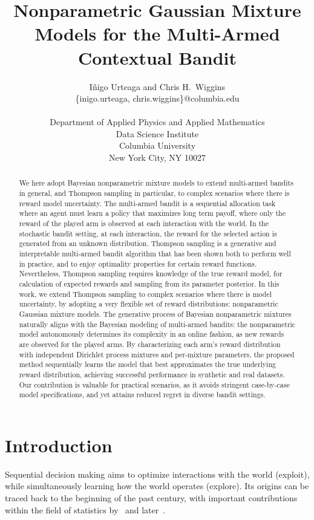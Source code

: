 \documentclass{article}
\title{Nonparametric Gaussian Mixture Models for the Multi-Armed Contextual Bandit}
\author{ I\~{n}igo Urteaga and Chris H.~Wiggins\\
	{\sf \{inigo.urteaga, chris.wiggins\}@columbia.edu} \\\\
	Department of	Applied Physics and Applied Mathematics\\
	Data Science Institute\\
	Columbia University\\
	New York City, NY 10027
}
\begin{document}
\maketitle

\begin{abstract}
We here adopt Bayesian nonparametric mixture models to extend multi-armed bandits in general, and Thompson sampling in particular, to complex scenarios where there is reward model uncertainty.
The multi-armed bandit is a sequential allocation task where an agent must learn a policy that maximizes long term payoff, where only the reward of the played arm is observed at each interaction with the world. In the stochastic bandit setting, at each interaction, the reward for the selected action is generated from an unknown distribution. Thompson sampling is a generative and interpretable multi-armed bandit algorithm that has been shown both to perform well in practice, and to enjoy optimality properties for certain reward functions. Nevertheless, Thompson sampling requires knowledge of the true reward model, for calculation of expected rewards and sampling from its parameter posterior. In this work, we extend Thompson sampling to complex scenarios where there is model uncertainty, by adopting a very flexible set of reward distributions: nonparametric Gaussian mixture models. The generative process of Bayesian nonparametric mixtures naturally aligns with the Bayesian modeling of multi-armed bandits: the nonparametric model autonomously determines its complexity in an online fashion, as new rewards are observed for the played arms. By characterizing each arm's reward distribution with independent Dirichlet process mixtures and per-mixture parameters, the proposed method sequentially learns the model that best approximates the true underlying reward distribution, achieving successful performance in synthetic and real datasets. Our contribution is valuable for practical scenarios, as it avoids stringent case-by-case model specifications, and yet attains reduced regret in diverse bandit settings.
\end{abstract}

\section{Introduction}
\label{sec:introduction}

Sequential decision making aims to optimize interactions with the world (exploit), while simultaneously learning how the world operates (explore). Its origins can be traced back to the beginning of the past century, with important contributions within the field of statistics by~\citet{j-Thompson1935} and later~\citet{j-Robbins1952}.
\end{document}
